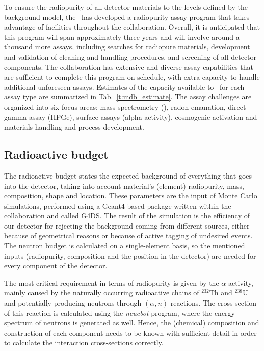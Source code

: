 To ensure the radiopurity of all detector materials to the levels defined by the background model, the \MAWG\ has developed a radiopurity assay program that takes advantage of facilities throughout the collaboration. Overall, it is anticipated that this program will span approximately three years and will involve around a thousand more assays, including searches for radiopure materials, development and validation of cleaning and handling procedures, and screening of all detector components. The collaboration has extensive and diverse assay capabilities that are sufficient to complete this program on schedule, with extra capacity to handle additional unforeseen assays. Estimates of the capacity available to \DSks\ for each assay type are summarized in Tab.~\ref{t:mdb_estimate}. The assay challenges are organized into six focus areas: mass spectrometry (\ICPMS), radon emanation, direct gamma assay (HPGe), surface assays (alpha activity), cosmogenic activation and materials handling and process development.


\subsection{Radioactive budget}
\label{sec:Mat-Bdg}

The radioactive budget states the expected background of everything that goes into the detector, taking into account material's (element) radiopurity, mass, composition, shape and location. These parameters are the input of Monte Carlo simulations, performed using a Geant4-based package written within the collaboration and called G4DS. The result of the simulation is the efficiency of our detector for rejecting the background coming from different sources, either because of geometrical reasons or because of active tagging of undesired events. The neutron budget is calculated on a single-element basis, so the mentioned inputs (radiopurity, composition and the position in the detector) are needed for every component of the detector.

The most critical requirement in terms of radiopurity is given by the $\alpha$ activity, mainly caused by the naturally occurring radioactive chains of $^{232}$Th and $^{238}$U and potentially producing neutrons through $(\alpha,n)$ reactions. The cross section of this reaction is calculated using the {\it neucbot} program, where the energy spectrum of neutrons is generated as well. Hence, the (chemical) composition and construction of each component needs to be known with sufficient detail in order to calculate the interaction cross-sections correctly.

